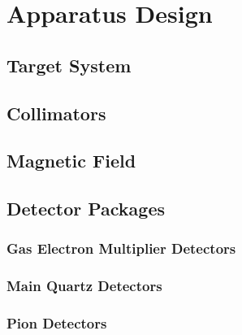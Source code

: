 \section{Apparatus Design}

\subsection{Target System}

\subsection{Collimators}

\subsection{Magnetic Field}

\subsection{Detector Packages}

\subsubsection{Gas Electron Multiplier Detectors}

\subsubsection{Main Quartz Detectors}

\subsubsection{Pion Detectors}